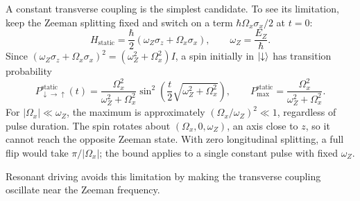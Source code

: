 A constant transverse coupling is the simplest candidate. To see
its limitation, keep the Zeeman splitting fixed and switch on
a term $\hbar\Omega_x\sigma_x/2$ at $t=0$:
\begin{equation}
  H_{\mathrm{static}}=\frac{\hbar}{2}
     (\omega_Z\sigma_z+\Omega_x\sigma_x),\qquad
  \omega_Z=\frac{E_Z}{\hbar}.
  \label{eq:static-transverse-hamiltonian}
\end{equation}
Since $(\omega_Z\sigma_z+\Omega_x\sigma_x)^2
=(\omega_Z^2+\Omega_x^2)I$, a spin initially in $\lvert \downarrow\rangle$
has transition probability
\begin{equation}
  P^{\mathrm{static}}_{\downarrow\to\uparrow}(t)
   =\frac{\Omega_x^2}{\omega_Z^2+\Omega_x^2}
      \sin^2\!\left(\frac{t}{2}\sqrt{\omega_Z^2+\Omega_x^2}\right),
  \qquad
  P_{\max}^{\mathrm{static}}
   =\frac{\Omega_x^2}{\omega_Z^2+\Omega_x^2}.
  \label{eq:static-transverse-probability}
\end{equation}
For $|\Omega_x|\ll\omega_Z$, the maximum is approximately
$(\Omega_x/\omega_Z)^2\ll1$, regardless of pulse duration. The spin rotates about $(\Omega_x,0,\omega_Z)$,
an axis close to $z$, so it cannot reach the opposite Zeeman state.
With zero longitudinal splitting, a full flip would take
$\pi/|\Omega_x|$; the bound applies to a single constant pulse
with fixed $\omega_Z$.

Resonant driving avoids this limitation by making the transverse
coupling oscillate near the Zeeman frequency.

